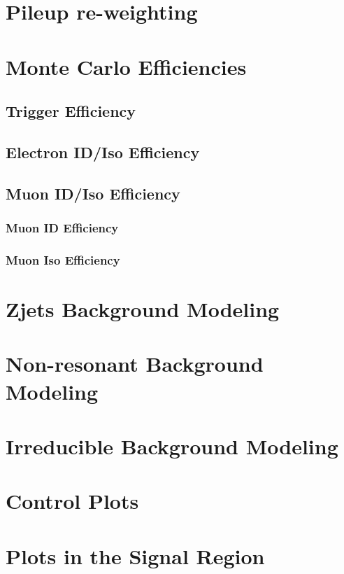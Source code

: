 \section{Pileup re-weighting}
\section{Monte Carlo Efficiencies}
\subsection{Trigger Efficiency}\label{sec:bkg_trig}
\subsection{Electron ID/Iso Efficiency}
\subsection{Muon ID/Iso Efficiency}
\subsubsection{Muon ID Efficiency}
\subsubsection{Muon Iso Efficiency}

\section{Zjets Background Modeling}\label{sec:dybk}

\section{Non-resonant Background Modeling}

\section{Irreducible Background Modeling}

\section{Control Plots}

\section{Plots in the Signal Region}
